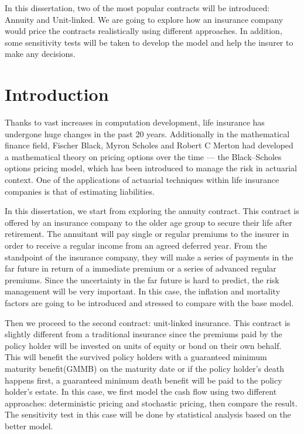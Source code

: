 \documentclass{report}
\begin{document}
In this dissertation, two of the most popular contracts will be introduced:
Annuity and Unit-linked. We are going to explore how an insurance
company would price the contracts realistically using different approaches.  In
addition, some sensitivity tests will be taken to develop the model and help the
insurer to make any decisions.






\chapter*{Introduction}


Thanks to vast increases in computation development, life insurance has
undergone huge changes in the past 20 years. Additionally in the mathematical
finance field, Fischer Black, Myron Scholes and Robert C Merton had developed
a mathematical theory on pricing options over the time --- the
Black--Scholes options pricing model, which has been introduced to manage
the risk in actuarial context. One of the applications of actuarial
techniques within life insurance companies is that of estimating liabilities.


In this dissertation, we start from exploring the annuity contract. This
contract is offered by an insurance company to the older age group to secure their
life after retirement. The annuitant will pay single or regular premiums to
the insurer in order to receive a regular income from an agreed deferred year.
From the standpoint of the insurance company, they will make a series of
payments in the far future in return of a immediate premium or a series of
advanced regular premiums. Since the uncertainty in the far future is hard to
predict, the risk management will be very important. In this case, the
inflation and mortality factors are going to be introduced and stressed to
compare with the base model.


Then we proceed to the second contract: unit-linked insurance. This contract is
slightly different from a traditional insurance since the premiums paid by the
policy holder will be invested on units of equity or bond on their own behalf.
This will benefit the survived policy holders with a guaranteed minimum
maturity benefit(GMMB) on the maturity date or if the policy holder's death
happens first, a guaranteed minimum death benefit will be paid to the policy
holder's estate. In this case, we first model the cash flow using two different
approaches: deterministic pricing and stochastic pricing, then compare the
result. The sensitivity test in this case will be done by statistical analysis
based on the better model.
\end{document}
